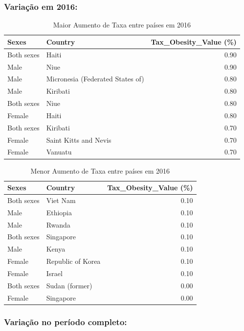 \documentclass{article}%
\begin{document}
%
\subsubsection{Variação em 2016:}%
\label{ssubsec:Variaoem2016}%


\begin{table}[htbp]%
\centering%
\begin{tabular}{llr}
\toprule
Sexes & Country & Tax\_Obesity\_Value (\%) \\
\midrule
Both sexes & Haiti & 0.90 \\
Male & Niue & 0.90 \\
Male & Micronesia (Federated States of) & 0.80 \\
Male & Kiribati & 0.80 \\
Both sexes & Niue & 0.80 \\
Female & Haiti & 0.80 \\
Both sexes & Kiribati & 0.70 \\
Female & Saint Kitts and Nevis & 0.70 \\
Female & Vanuatu & 0.70 \\
\bottomrule
\end{tabular}
%
\caption{Maior Aumento de Taxa entre países em 2016}%
\end{table}

%


\begin{table}[htbp]%
\centering%
\begin{tabular}{llr}
\toprule
Sexes & Country & Tax\_Obesity\_Value (\%) \\
\midrule
Both sexes & Viet Nam & 0.10 \\
Male & Ethiopia & 0.10 \\
Male & Rwanda & 0.10 \\
Both sexes & Singapore & 0.10 \\
Male & Kenya & 0.10 \\
Female & Republic of Korea & 0.10 \\
Female & Israel & 0.10 \\
Both sexes & Sudan (former) & 0.00 \\
Female & Singapore & 0.00 \\
\bottomrule
\end{tabular}
%
\caption{Menor Aumento de Taxa entre países em 2016}%
\end{table}

%
\newpage%
\subsubsection{Variação no período completo:}%
\label{ssubsec:Variaonoperodocompleto}%
\end{document}
